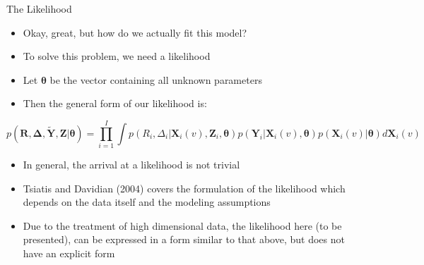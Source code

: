 \documentclass[
  ignorenonframetext,
]{beamer}
\providecommand{\tightlist}{%
  \setlength{\itemsep}{0pt}\setlength{\parskip}{0pt}}
\begin{document}
\begin{frame}{The Likelihood}
\protect\hypertarget{the-likelihood}{}
\begin{itemize}
\tightlist
\item
  Okay, great, but how do we actually fit this model?
\item
  To solve this problem, we need a likelihood
\item
  Let \(\boldsymbol{\theta}\) be the vector containing all unknown
  parameters
\item
  Then the general form of our likelihood is:
\end{itemize}

\[
p(\boldsymbol{R}, \boldsymbol{\Delta}, \tilde{\boldsymbol{Y}}, \boldsymbol{Z} | \boldsymbol{\theta})= \prod_{i=1}^I \int p(R_i, \Delta_i | \boldsymbol{X}_i(v), \boldsymbol{Z}_i, \boldsymbol{\theta})p(\boldsymbol{Y}_i|\boldsymbol{X}_i(v), \boldsymbol{\theta})p(\boldsymbol{X}_i(v)|\boldsymbol{\theta})d\boldsymbol{X}_i(v) 
\]

\begin{itemize}
\tightlist
\item
  In general, the arrival at a likelihood is not trivial
\item
  Tsiatis and Davidian (2004) covers the formulation of the likelihood
  which depends on the data itself and the modeling assumptions
\item
  Due to the treatment of high dimensional data, the likelihood here (to
  be presented), can be expressed in a form similar to that above, but
  does not have an explicit form
\end{itemize}
\end{frame}
\end{document}
